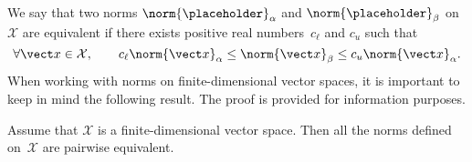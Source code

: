 We say that two norms $\norm{\placeholder}_{\alpha}$ and $\norm{\placeholder}_{\beta}$ on $\mathcal X$ are equivalent if
there exists positive real numbers~$c_{\ell}$ and $c_u$ such that
\begin{equation}
    \label{eq:norm_equilavence}
    \forall \vect x \in \mathcal X,
    \qquad c_{\ell} \norm{\vect x}_{\alpha}
    \leq \norm{\vect x}_{\beta}
    \leq c_u \norm{\vect x}_{\alpha}.
\end{equation}
When working with norms on finite-dimensional vector spaces,
it is important to keep in mind the following result.
The proof is provided for information purposes.
\begin{proposition}
    Assume that $\mathcal X$ is a finite-dimensional vector space.
    Then all the norms defined on~$\mathcal X$ are pairwise equivalent.
\end{proposition}
